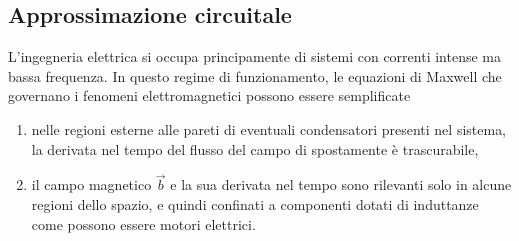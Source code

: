 \documentclass[letterpaper,10pt,italian]{jupyterBook}
\begin{document}
\subsection{Approssimazione circuitale}
\label{\detokenize{ch/electromagnetism/circuits-electric:approssimazione-circuitale}}\label{\detokenize{ch/electromagnetism/circuits-electric:physics-hs-electromagnetism-circuits-electric-approx}}
\sphinxAtStartPar
L’ingegneria elettrica si occupa principamente di sistemi con correnti intense ma bassa frequenza. In questo regime di funzionamento, le equazioni di Maxwell che governano i fenomeni elettromagnetici possono essere semplificate
\begin{enumerate}
%
\item {} 
\sphinxAtStartPar
nelle regioni esterne alle pareti di eventuali condensatori presenti nel sistema, la derivata nel tempo del flusso del campo di spostamente è trascurabile,

\item {} 
\sphinxAtStartPar
il campo magnetico \(\vec{b}\) e la sua derivata nel tempo sono rilevanti solo in alcune regioni dello spazio, e quindi confinati a componenti dotati di induttanze \sphinxhyphen{} come possono essere motori elettrici.

\end{enumerate}
\end{document}

